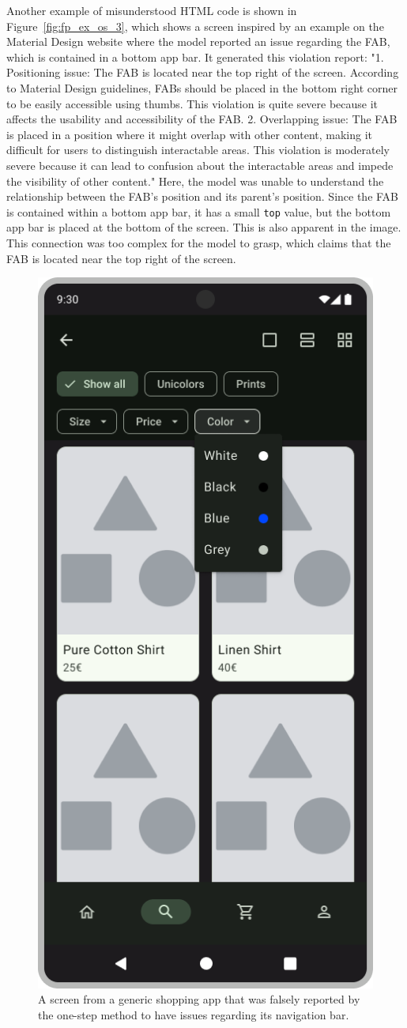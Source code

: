 \documentclass[11pt,titlepage,oneside,openany]{book}
\begin{document}
Another example of misunderstood HTML code is shown in Figure~\ref{fig:fp_ex_os_3}, which shows a screen inspired by an example on the Material Design website \cite{noauthor_bottom_nodate} where the model reported an issue regarding the FAB, which is contained in a bottom app bar. It generated this violation report: "1. Positioning issue: The FAB is located near the top right of the screen. According to Material Design guidelines, FABs should be placed in the bottom right corner to be easily accessible using thumbs. This violation is quite severe because it affects the usability and accessibility of the FAB. 2. Overlapping issue: The FAB is placed in a position where it might overlap with other content, making it difficult for users to distinguish interactable areas. This violation is moderately severe because it can lead to confusion about the interactable areas and impede the visibility of other content." Here, the model was unable to understand the relationship between the FAB's position and its parent's position. Since the FAB is contained within a bottom app bar, it has a small \texttt{top} value, but the bottom app bar is placed at the bottom of the screen. This is also apparent in the image. This connection was too complex for the model to grasp, which claims that the FAB is located near the top right of the screen. 

\begin{figure}[t]
	\centering
	\includegraphics[width=.28\textwidth]{figures/fp_ex_os_2.jpg}
	\caption{A screen from a generic shopping app that was falsely reported by the one-step method to have issues regarding its navigation bar.}
	\label{fig:fp_ex_os_2}
\end{figure}
\end{document}
